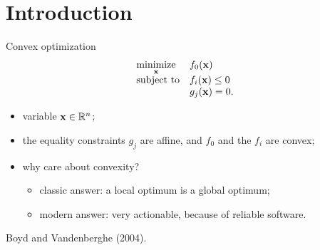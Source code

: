 \documentclass[10pt,mathserif,aspectratio=169]{beamer}
\newcommand{\bul}{\setlength\itemsep{1.1ex}}
\begin{document}
\section{Introduction}

\begin{frame}{Convex optimization}
\vspace{-1ex}
\[
  \begin{array}{ll}
    \underset{\mathbf{x}}{\mbox{minimize}} & f_0(\mathbf{x}) \\[0.5ex]
    \mbox{subject to}                    & f_i(\mathbf{x}) \le 0 \\
                                         & g_j(\mathbf{x}) = 0.
  \end{array}
\]

\vspace{1ex}
\begin{itemize}\small\bul
  \item variable $\mathbf{x} \in \mathbb{R}^n$;
  \item the equality constraints $g_j$ are affine, and $f_0$ and the $f_i$ are convex;
  \item why care about convexity?
    \begin{itemize}\small
      \item<2->[--] classic answer: a local optimum is a global optimum;
      \item<2->[--] modern answer: very actionable, because of reliable software.
    \end{itemize}
\end{itemize}

\vfill
{\scriptsize\color{black!55} Boyd and Vandenberghe (2004).}
\end{frame}
\end{document}
